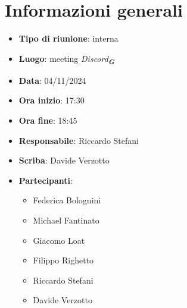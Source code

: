 


\section{Informazioni generali}

\begin{itemize}
    \item \textbf{Tipo di riunione}: interna
    \item \textbf{Luogo}: meeting \emph{Discord}\textsubscript{\textit{\textbf{G}}}
    \item \textbf{Data}: 04/11/2024
    \item \textbf{Ora inizio}: 17:30
    \item \textbf{Ora fine}: 18:45
    \item \textbf{Responsabile}: Riccardo Stefani
    \item \textbf{Scriba}: Davide Verzotto
    \item \textbf{Partecipanti}:
    \begin{itemize}
        \item Federica Bolognini
        \item Michael Fantinato
        \item Giacomo Loat
        \item Filippo Righetto
        \item Riccardo Stefani
        \item Davide Verzotto
    \end{itemize}
\end{itemize}
